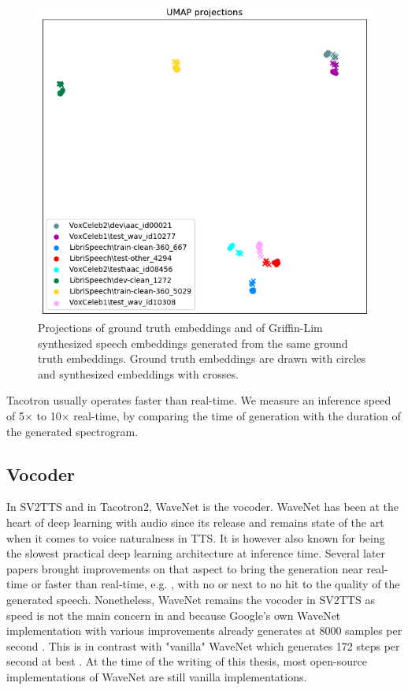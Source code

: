 \documentclass[a4paper, oneside, 12pt, english]{article}
\begin{document}
\begin{figure}[h]
	\centering
	\includegraphics[width=0.65\linewidth]{images/projections_griffin.png}
	\caption{Projections of ground truth embeddings and of Griffin-Lim synthesized speech embeddings generated from the same ground truth embeddings. Ground truth embeddings are drawn with circles and synthesized embeddings with crosses.}
	\label{projections_griffin}
\end{figure}

Tacotron usually operates faster than real-time. We measure an inference speed of 5$\times$ to 10$\times$ real-time, by comparing the time of generation with the duration of the generated spectrogram.


\subsection{Vocoder} \label{vocoder}
In SV2TTS and in Tacotron2, WaveNet is the vocoder. WaveNet has been at the heart of deep learning with audio since its release and remains state of the art when it comes to voice naturalness in TTS. It is however also known for being the slowest practical deep learning architecture at inference time. Several later papers brought improvements on that aspect to bring the generation near real-time or faster than real-time, e.g. \citep{ParallelWaveNet, FastWaveNet, WaveRNN}, with no or next to no hit to the quality of the generated speech. Nonetheless, WaveNet remains the vocoder in SV2TTS as speed is not the main concern in \citep{SV2TTS} and because Google's own WaveNet implementation with various improvements already generates at 8000 samples per second \citep[page~2]{WaveRNN}. This is in contrast with "vanilla" WaveNet which generates 172 steps per second at best \citep[page 7]{ParallelWaveNet}. At the time of the writing of this thesis, most open-source implementations of WaveNet are still vanilla implementations.
\end{document}
